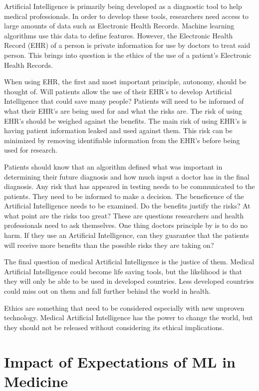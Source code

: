 \documentclass[]{article}
\begin{document}
		Artificial Intelligence is primarily being developed as a diagnostic tool to help medical professionals. In order to develop these tools, researchers need access to large amounts of data such as Electronic Health Records. Machine learning algorithms use this data to define features. However, the Electronic Health Record (EHR) of a person is private information for use by doctors to treat said person. This brings into question is the ethics of the use of a patient’s Electronic Health Records.

		When using EHR, the first and most important principle, autonomy, should be thought of. Will patients allow the use of their EHR’s to develop Artificial Intelligence that could save many people? Patients will need to be informed of what their EHR’s are being used for and what the risks are. The risk of using EHR’s should be weighed against the benefits. The main risk of using EHR’s is having patient information leaked and used against them. This risk can be minimized by removing identifiable information from the EHR’s before being used for research.

		Patients should know that an algorithm defined what was important in determining their future diagnosis and how much input a doctor has in the final diagnosis. Any risk that has appeared in testing needs to be communicated to the patients. They need to be informed to make a decision. The beneficence of the Artificial Intelligence needs to be examined. Do the benefits justify the risks? At what point are the risks too great? These are questions researchers and health professionals need to ask themselves. One thing doctors principle by is to do no harm. If they use an Artificial Intelligence, can they guarantee that the patients will receive more benefits than the possible risks they are taking on? 

		The final question of medical Artificial Intelligence is the justice of them. Medical Artificial Intelligence could become life saving tools, but the likelihood is that they will only be able to be used in developed countries. Less developed countries could miss out on them and fall further behind the world in health.

		Ethics are something that need to be considered especially with new unproven technology. Medical Artificial Intelligence has the power to change the world, but they should not be released without considering its ethical implications.

	\section{Impact of Expectations of ML in Medicine}
\end{document}
